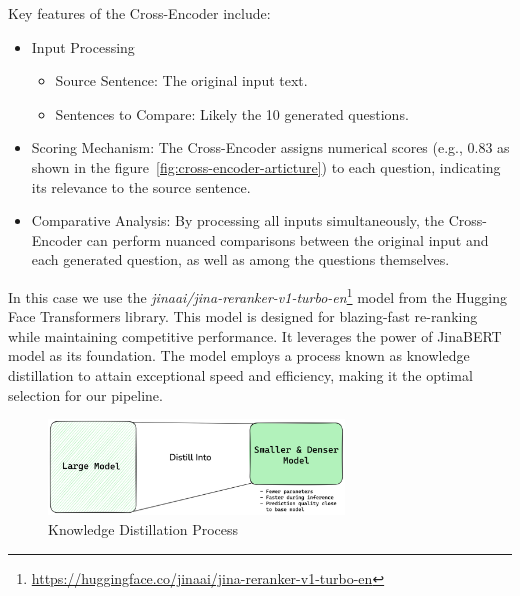 Key features of the Cross-Encoder include:

\begin{itemize}
    \item Input Processing
    \begin{itemize}
        \item Source Sentence: The original input text.
        \item Sentences to Compare: Likely the 10 generated questions.
    \end{itemize}
    \item Scoring Mechanism: The Cross-Encoder assigns numerical scores (e.g., 0.83 as shown in the figure~\ref{fig:cross-encoder-articture}) to each question, indicating its relevance to the source sentence.
    \item Comparative Analysis: By processing all inputs simultaneously, the Cross-Encoder can perform nuanced comparisons between the original input and each generated question, as well as among the questions themselves.
\end{itemize}

In this case we use the \textit{jinaai/jina-reranker-v1-turbo-en}\footnote{\url{https://huggingface.co/jinaai/jina-reranker-v1-turbo-en}} model from the Hugging Face Transformers library.
This model is designed for blazing-fast re-ranking while maintaining competitive performance.
It leverages the power of JinaBERT~\cite{günther2024jinaembeddings28192token} model as its foundation.
The model employs a process known as knowledge distillation to attain exceptional speed and efficiency, making it the optimal selection for our pipeline.

\begin{figure}[ht!]
    \centering
    \begin{minipage}[b]{\textwidth}
        \centering
        \includegraphics[width=0.7\textwidth]{res/knowledge-distill}
        \caption{Knowledge Distillation Process}
        \label{fig:knowledge-distill}
    \end{minipage}
\end{figure}


